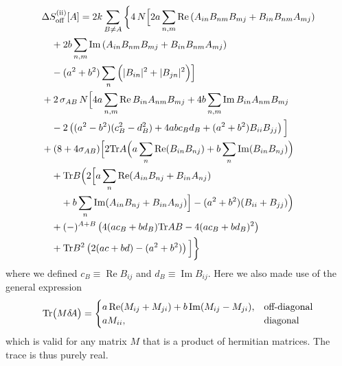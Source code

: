 \documentclass[10pt,a4paper]{article}
\newcommand{\RN}[1]{%
    \textup{\uppercase\expandafter{\romannumeral#1}}%
}
\newcommand{\Tr}{\mathrm{Tr}\vspace{-2pt}}
\newcommand{\deltaA}{\delta \! A}
\begin{document}
\begin{align}
  &\Delta S^{(\RN{2})}_{\mathrm{off}} [A] =
  2k \sum_{B \neq A}
  \bigg\{
    4 \, N
    \Big[
      2a \sum_{n,m} \operatorname{Re}
      \left( A_{in} B_{nm} B_{mj} + B_{in} B_{nm} A_{mj} \right)\\
      &\quad+ 2b \sum_{n,m} \operatorname{Im}
      \left( A_{in} B_{nm} B_{mj} + B_{in} B_{nm} A_{mj} \right)\\
      &\quad- (a^2 + b^2) \sum_n \Big( |B_{in}|^2 + |B_{jn}|^2 \Big)
    \Big]
    \nonumber \\
  &+ 2 \,  \sigma_{AB} \, N   \Big[
    4a \sum_{n,m} \operatorname{Re} B_{in} A_{nm} B_{mj}
    +4b \sum_{n,m} \operatorname{Im} B_{in} A_{nm} B_{mj} \\
    &\quad-
    2 \left(
      (a^2-b^2)(c_B^2-d_B^2) + 4abc_B d_B + (a^2+b^2) B_{ii} B_{jj}
    \right)
  \Big]\\
  &+ (8+4\sigma_{AB}) \Big[
    2 \Tr A \Big(
      a \sum_n \operatorname{Re} (B_{in} B_{nj})
      +b \sum_n \operatorname{Im} (B_{in} B_{nj})
          \Big) \\
    &\quad+ \Tr B
          \Big(
            2
            \Big[
              a \sum_n \operatorname{Re} (A_{in} B_{nj} + B_{in} A_{nj}) \\
              &\quad\quad+b \sum_n \operatorname{Im} (A_{in} B_{nj} + B_{in} A_{nj})
            \Big]
            - (a^2+b^2)(B_{ii}+B_{jj})
          \Big)
          \nonumber \\
      &\quad+ (-)^{A+B} \left(
       4 (ac_B+bd_B) \Tr AB - 4(ac_B+bd_B)^2
     \right) \\
   &\quad+ \Tr B^2 \left( 2(ac+bd)-(a^2+b^2) \right)
  \Big]
 \bigg\}
\end{align}
where we defined $c_B \equiv \operatorname{Re} B_{ij}$ and
$d_B \equiv \operatorname{Im} B_{ij}$.
Here we also made use of the general expression
\begin{align}
  \Tr \big( M \deltaA \big) =
  \begin{cases}
    a \operatorname{Re} (M_{ij} + M_{ji})
    +b \operatorname{Im} (M_{ij} - M_{ji}), &\text{off-diagonal}\\
    a M_{ii}, &\text{diagonal}
  \end{cases}
\end{align}
which is valid for any matrix $M$ that is a product of hermitian matrices.
The trace is thus purely real.
\end{document}
